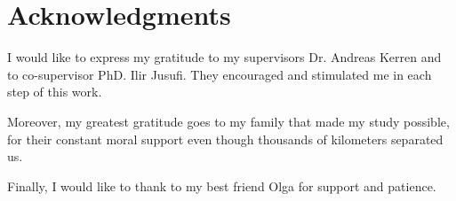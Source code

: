 \section*{Acknowledgments}
\label{sec:acknowledgments}

I would like to express my gratitude to my supervisors Dr. Andreas Kerren and to co-supervisor PhD. Ilir Jusufi. They encouraged and stimulated me in each step of this work.

Moreover, my greatest gratitude goes to my family that made my study possible, for their constant moral support even though thousands of kilometers separated us.

Finally, I would like to thank to my best friend Olga for support and patience.
